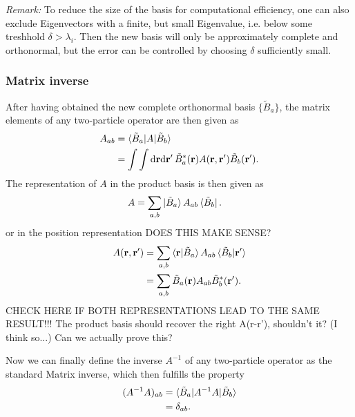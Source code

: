 \documentclass[12pt,a4paper]{scrartcl}
\numberwithin{equation}{section}
\newcommand{\cng}[1]{{\color{red}#1}}
\renewcommand{\vec}{\mathbf}
\begin{document}
\textit{Remark:}
To reduce the size of the basis for computational efficiency, one can also exclude Eigenvectors with a finite, 
but small Eigenvalue, i.e. below some treshhold $\delta > \lambda_i$.
Then the new basis will only be approximately complete and orthonormal, but the error can be controlled by choosing
$\delta$ sufficiently small.

\subsubsection{Matrix inverse}

After having obtained the new complete orthonormal basis $\{ \tilde{B}_a  \}$, the matrix elements
of any two-particle operator are then given as
\begin{align}
A_{ab}
&= \braket{ \tilde{B}_a | A | \tilde{B}_b } \\
&= \int \int \mathrm{d}\vec{r}\mathrm{d}\vec{r}' \,  \tilde{B}^*_a(\vec{r})  A(\vec{r},\vec{r}') \tilde{B}_b(\vec{r}').
\end{align}
The representation of $A$ in the product basis is then given as
\begin{align}
A &= \sum_{a,b} \ket{\tilde{B}_a}A_{ab}\bra{\tilde{B}_b} .
\end{align}
or in the position representation \cng{DOES THIS MAKE SENSE?}
\begin{align}
 A(\vec{r},\vec{r}') &= \sum_{a,b} \braket{\vec{r}|\tilde{B}_a} A_{ab}\braket{\tilde{B}_b|\vec{r}'} \\
 &= \sum_{a,b} \tilde{B}_a(\vec{r}) A_{ab}\tilde{B}^*_b(\vec{r}') .
\end{align}
\cng{CHECK HERE IF BOTH REPRESENTATIONS LEAD TO THE SAME RESULT!!! The product basis should recover
the right A(r-r'), shouldn't it? (I think so...) Can we actually prove this?}

Now we can finally define the inverse $A^{-1}$ of any two-particle operator as the standard Matrix inverse, which then fulfills 
the property
\begin{align}
 (A^{-1}A)_{ab}
&= \braket{ \tilde{B}_a | A^{-1}A | \tilde{B}_b } \\
&= \delta_{ab}.
\end{align}
\end{document}
